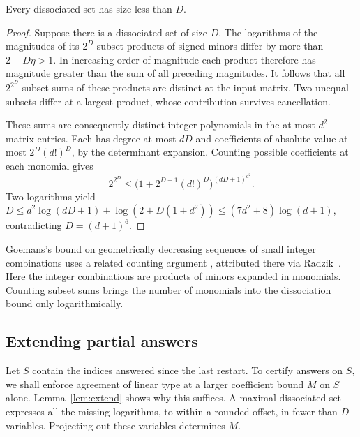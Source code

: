 \begin{lemma}\label{lem:dissociated}
Every dissociated set has size less than \(D\).
\end{lemma}
\begin{proof}
Suppose there is a dissociated set of size \(D\). The logarithms of
the magnitudes of its \(2^D\) subset products of signed minors differ by more
than \(2-D\eta>1\). In increasing order of magnitude each product
therefore has magnitude greater than the sum of all preceding
magnitudes. It follows that all \(2^{2^D}\) subset sums of these
products are distinct at the input matrix. Two unequal subsets
differ at a largest product, whose contribution survives cancellation.

These sums are consequently distinct integer polynomials in the
at most \(d^2\) matrix entries. Each has degree at most \(dD\) and
coefficients of absolute value at most \(2^D(d!)^D\), by the
determinant expansion. Counting possible coefficients at each
monomial gives
\[
 2^{2^D}\le
 \big(1+2^{D+1}(d!)^D\big)^{(dD+1)^{d^2}}.
\]
Two logarithms yield
\(D\le d^2\log(dD+1)+\log(2+D(1+d^2))
\le(7d^2+8)\log(d+1)\), contradicting \(D=(d+1)^6\).
\end{proof}

Goemans's bound on geometrically decreasing sequences of small integer
combinations uses a related counting argument
\cite[Lemma~3.5 in the preprint]{Newton}, attributed there via
Radzik~\cite{Rad}. Here the integer combinations are products of
minors expanded in monomials. Counting subset sums brings the
number of monomials into the dissociation bound only logarithmically.

\subsection{Extending partial answers}

Let \(S\) contain the indices answered since the last restart. To
certify answers on \(S\), we shall enforce agreement of linear type
at a larger coefficient bound \(M\) on \(S\) alone. Lemma~\ref{lem:extend}
shows why this suffices. A maximal dissociated set expresses all the
missing logarithms, to within a rounded offset, in fewer than \(D\)
variables. Projecting out these variables determines \(M\).

